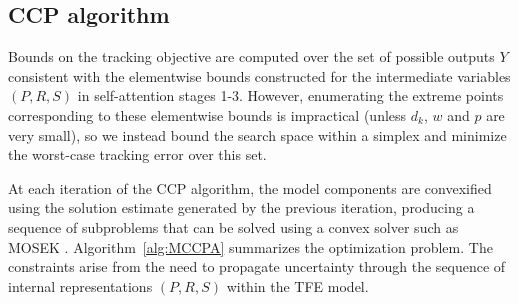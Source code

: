 \documentclass{ifacconf}
\begin{document}
\subsection{CCP algorithm}

Bounds on the tracking objective are
computed over the set of possible outputs $Y$ consistent with the elementwise bounds constructed for the intermediate variables $(P,R,S)$ in self-attention stages 1-3.
%
However, enumerating the extreme points corresponding to these elementwise bounds is impractical (unless $d_k$, $w$ and $p$ are very small), so we instead bound the search space within a simplex and minimize the worst-case tracking error over this set. 


At each iteration of the CCP algorithm, the model components are convexified using the solution estimate generated by the previous iteration, producing a sequence of subproblems that can be solved using a convex solver such as MOSEK \citep{mosek}. Algorithm~\ref{alg:MCCPA} summarizes the optimization problem. The constraints arise from the need to propagate uncertainty through the sequence of internal representations
$(P, R, S)$ within the TFE model. 
\end{document}
